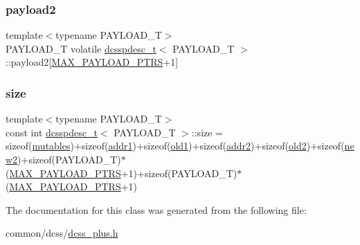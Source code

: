 \subsubsection{\texorpdfstring{payload2}{payload2}}
{\footnotesize\ttfamily template$<$typename P\+A\+Y\+L\+O\+A\+D\+\_\+T$>$ \\
P\+A\+Y\+L\+O\+A\+D\+\_\+T volatile \hyperlink{classdcsspdesc__t}{dcsspdesc\+\_\+t}$<$ P\+A\+Y\+L\+O\+A\+D\+\_\+T $>$\+::payload2\mbox{[}\hyperlink{dcss__plus_8h_af06e916cb13168b5e10308a196165616}{M\+A\+X\+\_\+\+P\+A\+Y\+L\+O\+A\+D\+\_\+\+P\+T\+RS}+1\mbox{]}}

\mbox{\label{classdcsspdesc__t_a29649c162a785ff33c3fb6967a9838f7}} 
\subsubsection{\texorpdfstring{size}{size}}
{\footnotesize\ttfamily template$<$typename P\+A\+Y\+L\+O\+A\+D\+\_\+T$>$ \\
const int \hyperlink{classdcsspdesc__t}{dcsspdesc\+\_\+t}$<$ P\+A\+Y\+L\+O\+A\+D\+\_\+T $>$\+::size = sizeof(\hyperlink{classdcsspdesc__t_a0c377eb0bb0ca80e67bfdb958bc154a3}{mutables})+sizeof(\hyperlink{classdcsspdesc__t_a07f31abfd3e37e000c9335420843538a}{addr1})+sizeof(\hyperlink{classdcsspdesc__t_ae4e128e33e5819e8df288c149ad6a9c2}{old1})+sizeof(\hyperlink{classdcsspdesc__t_ae7f0547246e681d570349d653999d04a}{addr2})+sizeof(\hyperlink{classdcsspdesc__t_a898e3c1a51fff0a73c484b1f3ed2fc49}{old2})+sizeof(\hyperlink{classdcsspdesc__t_a26e12bf581a9cf3b5007d6affed2d944}{new2})+sizeof(P\+A\+Y\+L\+O\+A\+D\+\_\+T)$\ast$(\hyperlink{dcss__plus_8h_af06e916cb13168b5e10308a196165616}{M\+A\+X\+\_\+\+P\+A\+Y\+L\+O\+A\+D\+\_\+\+P\+T\+RS}+1)+sizeof(P\+A\+Y\+L\+O\+A\+D\+\_\+T)$\ast$(\hyperlink{dcss__plus_8h_af06e916cb13168b5e10308a196165616}{M\+A\+X\+\_\+\+P\+A\+Y\+L\+O\+A\+D\+\_\+\+P\+T\+RS}+1)\hspace{0.3cm}{\ttfamily [static]}}



The documentation for this class was generated from the following file\+:\begin{DoxyCompactItemize}
\item 
common/dcss/\hyperlink{dcss__plus_8h}{dcss\+\_\+plus.\+h}\end{DoxyCompactItemize}
